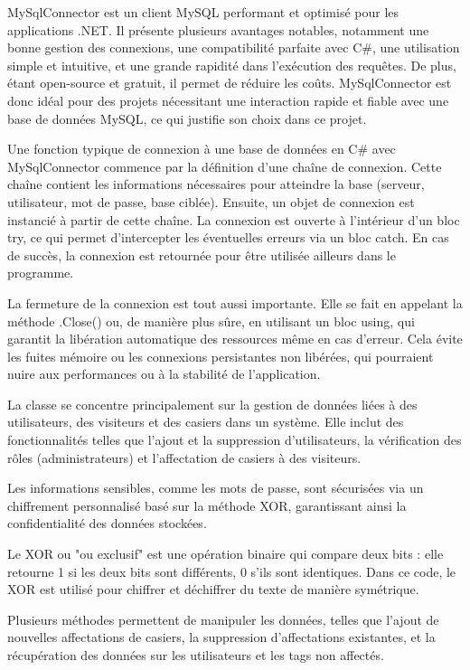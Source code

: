 \documentclass[main.tex]{subfiles}
\begin{document}
MySqlConnector est un client MySQL performant et optimisé pour les applications .NET. Il présente plusieurs avantages notables, notamment une bonne gestion des connexions, une compatibilité parfaite avec C\#, une utilisation simple et intuitive, et une grande rapidité dans l'exécution des requêtes. De plus, étant open-source et gratuit, il permet de réduire les coûts. MySqlConnector est donc idéal pour des projets nécessitant une interaction rapide et fiable avec une base de données MySQL, ce qui justifie son choix dans ce projet.  

Une fonction typique de connexion à une base de données en C\# avec MySqlConnector commence par la définition d’une chaîne de connexion. Cette chaîne contient les informations nécessaires pour atteindre la base (serveur, utilisateur, mot de passe, base ciblée). Ensuite, un objet de connexion est instancié à partir de cette chaîne. La connexion est ouverte à l’intérieur d’un bloc try, ce qui permet d’intercepter les éventuelles erreurs via un bloc catch. En cas de succès, la connexion est retournée pour être utilisée ailleurs dans le programme. 

La fermeture de la connexion est tout aussi importante. Elle se fait en appelant la méthode .Close() ou, de manière plus sûre, en utilisant un bloc using, qui garantit la libération automatique des ressources même en cas d’erreur. Cela évite les fuites mémoire ou les connexions persistantes non libérées, qui pourraient nuire aux performances ou à la stabilité de l’application. 

La classe se concentre principalement sur la gestion de données liées à des utilisateurs, des visiteurs et des casiers dans un système. Elle inclut des fonctionnalités telles que l'ajout et la suppression d'utilisateurs, la vérification des rôles (administrateurs) et l'affectation de casiers à des visiteurs. 

Les informations sensibles, comme les mots de passe, sont sécurisées via un chiffrement personnalisé basé sur la méthode XOR, garantissant ainsi la confidentialité des données stockées.  

Le XOR ou "ou exclusif" est une opération binaire qui compare deux bits : elle retourne 1 si les deux bits sont différents, 0 s'ils sont identiques. Dans ce code, le XOR est utilisé pour chiffrer et déchiffrer du texte de manière symétrique. 

Plusieurs méthodes permettent de manipuler les données, telles que l'ajout de nouvelles affectations de casiers, la suppression d'affectations existantes, et la récupération des données sur les utilisateurs et les tags non affectés. 
\end{document}
